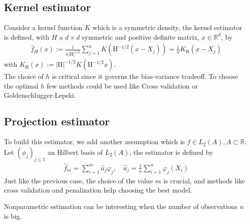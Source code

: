 \documentclass{article}
\begin{document}
\subsection{Kernel estimator}
Consider a kernel function \(K\) which is a symmetric density, the kernel estimator is defined, with \(H\) a \(d\times d\) symmetric and positive definite matrix, \(x\in\mathbb{R}^d\), by 
\begin{align}
\hat{f}_H(x):=\frac{1}{n|\mathrm{H}|^{1/2}}\sum_{j=1}^n K\left(\mathrm{H}^{-1/2}(x-X_j)\right)=\frac{1}{n}K_\mathrm{H}\left(x-X_j\right)
\end{align}
with \(K_\mathrm{H}(x):= |\mathrm{H}|^{-1/2}K(\mathrm{H}^{-1/2}x)\). \\
The choice of \(h\) is critical since it governs the bias-variance tradeoff. To choose the optimal \(h\) few methods could be used like Cross validation or Goldenschlugger-Lepski.

\subsection{Projection estimator}
To build this estimator, we add another assumption which is \(f\in L_2(A), A\subset \mathbb{R}\). \\
Let \((\phi_j)_{j\le 1}\) an Hilbert basis of \(L_2(A)\), the estimator is defined by 
\begin{align}
    \hat{f}_m=\sum_{i=1}^m\hat{a}_j\varphi_j, \quad \hat{a}_j=\frac{1}{n}\sum_{i=1}^n \varphi_j(X_i)
\end{align}
Just like the previous case, the choice of the value \(m\) is crucial, and methods like cross validation and penalization help choosing the best model.

\bigskip
Nonparametric estimation can be interesting when the number of observations \(n\) is big.

\newpage
\nocite{Coste_2025}
\nocite{lipman2024flowmatchingguidecode}
\nocite{strasman2025analysisnoiseschedulescorebased}


\end{document}
